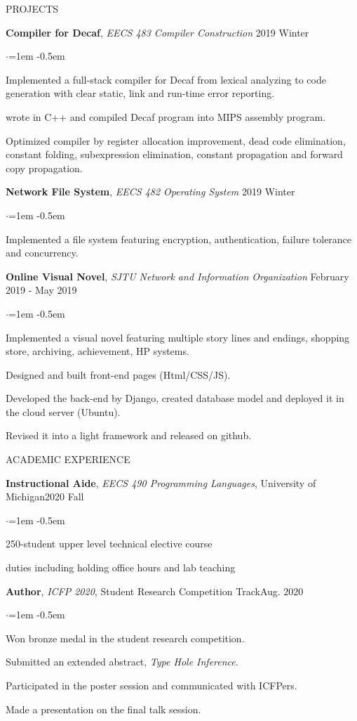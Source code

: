 \documentclass{resume} %
\newcommand{\rrsection}[5]{%
 {\textbf{#1}, }{\textit{#2},} {#3}\hfill{#4} \noindent
  \begin{list}{$\cdot$}{\leftmargin=1em}
   \itemsep -0.5em \vspace{-0.5em} 
  #5
  \end{list}
}
\newcommand{\project}[4]{%
 {\textbf{#1}, }{\textit{#2}} \hfill{#3} \noindent
  \begin{list}{$\cdot$}{\leftmargin=1em}
   \itemsep -0.5em \vspace{-0.5em} 
  #4
  \end{list}
}
\begin{document}
\begin{rSection}{PROJECTS}

\project{Compiler for Decaf}{EECS 483
  Compiler Construction}{2019 Winter}{
  \item Implemented a full-stack compiler for Decaf from lexical analyzing to code generation with clear static, link and run-time error reporting.
  \item wrote in C++ and compiled Decaf program into MIPS assembly program.
  \item Optimized compiler by register allocation improvement, dead code elimination, constant folding, subexpression elimination, constant propagation and forward copy propagation.
}


\project{Network File System}{EECS 482
  Operating System}{2019 Winter}{
  \item Implemented a file system featuring encryption, authentication, failure tolerance and concurrency.
}

\project{Online Visual Novel}{SJTU Network and Information Organization}{February 2019 - May 2019}{
	\item Implemented a visual novel featuring multiple story lines and endings, shopping store, archiving, achievement, HP systems.
  \item Designed and built front-end pages (Html/CSS/JS).
  \item Developed the back-end by Django, created database model and deployed it in the cloud server (Ubuntu).
  \item Revised it into a light framework and released on github.
}



\end{rSection}

\begin{rSection}{ACADEMIC EXPERIENCE}

\rrsection{Instructional Aide}{EECS 490 Programming Languages}{University
  of Michigan}{2020 Fall}{
  \item 250-student upper level technical elective course
  \item duties including holding office hours and lab teaching
}

\rrsection{Author}{ICFP 2020}{Student Research Competition Track}{Aug. 2020}{
  \item Won bronze medal in the student research competition.
  \item Submitted an extended abstract, \textit{Type Hole Inference}.
  \item Participated in the poster session and communicated with ICFPers.
  \item Made a presentation on the final talk session.
}

\end{rSection}
\end{document}
